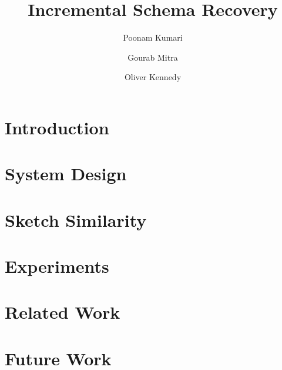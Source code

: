 \documentclass[sigconf]{acmart}
\begin{document}
\title{Incremental Schema Recovery}


\author{Poonam Kumari}

\author{Gourab Mitra}

\author{Oliver Kennedy}


\renewcommand{\shortauthors}{Kumari et al.}


\begin{abstract}

\end{abstract}

%
%


\maketitle

\section{Introduction}


\section{System Design}

\section{Sketch Similarity}

\section{Experiments}


\section{Related Work}


\section{Future Work}




\end{document}
